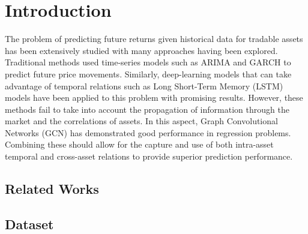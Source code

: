 \section{Introduction}

The problem of predicting future returns given historical data for tradable assets has been extensively studied 
with many approaches having been explored. 
Traditional methods used time-series models such as ARIMA and GARCH to predict future price movements. 
Similarly, deep-learning models that can take advantage of temporal relations such as Long Short-Term Memory (LSTM) models 
have been applied to this problem with promising results. 
However, these methods fail to take into account the propagation of information through the market and the correlations of assets. 
In this aspect, Graph Convolutional Networks (GCN) has demonstrated good performance in regression problems. 
Combining these should allow for the capture and use of both intra-asset temporal and cross-asset relations 
to provide superior prediction performance.

\subsection{Related Works}

\subsection{Dataset}